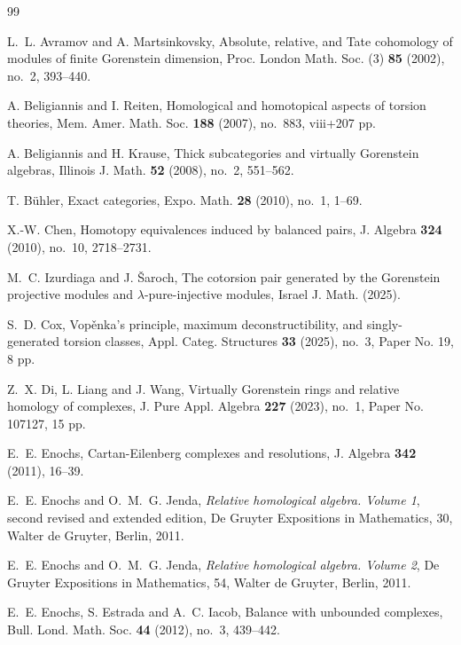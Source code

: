 \documentclass[reqno,12pt]{amsart}
\numberwithin{equation}{section}
\theoremstyle{plain}
\theoremstyle{definition}
\begin{document}
\begin{thebibliography}{99}

 L.~L. Avramov and A. Martsinkovsky, Absolute, relative, and Tate cohomology of modules of finite Gorenstein dimension, Proc. London Math. Soc. (3) {\bf 85} (2002), no.~2, 393--440.

 A. Beligiannis and I. Reiten, Homological and homotopical aspects of torsion theories, Mem. Amer. Math. Soc. {\bf 188} (2007), no.~883, viii+207 pp.

 A. Beligiannis and H. Krause, Thick subcategories and virtually Gorenstein algebras, Illinois J. Math. {\bf 52} (2008), no.~2, 551--562.

 T. B\"uhler, Exact categories, Expo. Math. {\bf 28} (2010), no.~1, 1--69.

 X.-W. Chen, Homotopy equivalences induced by balanced pairs, J. Algebra {\bf 324} (2010), no.~10, 2718--2731.

 M.~C. Izurdiaga and J. \v{S}aroch, The cotorsion pair generated by the Gorenstein projective modules and $\lambda$-pure-injective modules, Israel J. Math. (2025).

 S.~D. Cox, Vop\v enka's principle, maximum deconstructibility, and singly-generated torsion classes, Appl. Categ. Structures {\bf 33} (2025), no.~3, Paper No. 19, 8 pp.

 Z.~X. Di, L. Liang and J. Wang, Virtually Gorenstein rings and relative homology of complexes, J. Pure Appl. Algebra {\bf 227} (2023), no.~1, Paper No. 107127, 15 pp.


 E.~E. Enochs, Cartan-Eilenberg complexes and resolutions, J. Algebra {\bf 342} (2011), 16--39.

 E.~E. Enochs and O.~M.~G. Jenda, {\it Relative homological algebra. Volume 1}, second revised and extended edition,
De Gruyter Expositions in Mathematics, 30, Walter de Gruyter, Berlin, 2011.

 E.~E. Enochs and O.~M.~G. Jenda, {\it Relative homological algebra. Volume 2}, De Gruyter Expositions in Mathematics, 54, Walter de Gruyter, Berlin, 2011.

 E.~E. Enochs, S. Estrada and A.~C. Iacob, Balance with unbounded complexes, Bull. Lond. Math. Soc. {\bf 44} (2012), no.~3, 439--442.


\end{thebibliography}
\end{document}
